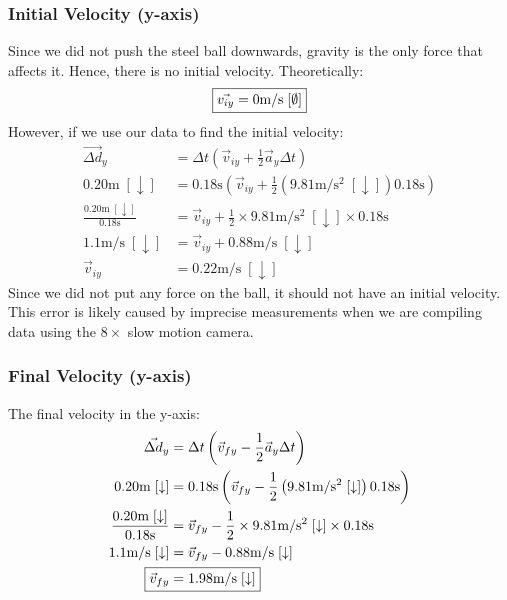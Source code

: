 \documentclass[a4paper,12pt]{article}
\begin{document}
	\subsubsection{Initial Velocity (y-axis)}
	Since we did not push the steel ball downwards, gravity is the only force that affects it. Hence, there is no initial velocity. Theoretically:
	\begin{align*}
		\Aboxed{\vec{v_{iy}}&=0\text{m}/\text{s}\;[\emptyset]}\\
	\end{align*}
	However, if we use our data to find the initial velocity:
	\begin{align*}
		\vec{\Delta d}_y&=\Delta t\left(\vec{v}_{iy}+\frac{1}{2}\vec{a}_y\Delta t\right)\\
		0.20\text{m}\;[\downarrow]&=0.18\text{s}\left(\vec{v}_{iy}+\frac{1}{2}\left(9.81\text{m}/\text{s}^2\;[\downarrow]\right)0.18\text{s}\right)\\
		\frac{0.20\text{m}\;[\downarrow]}{0.18\text{s}}&=\vec{v}_{iy}+\frac{1}{2}\times9.81\text{m}/\text{s}^2\;[\downarrow]\times0.18\text{s}\\
		1.1\text{m}/\text{s}\;[\downarrow]&=\vec{v}_{iy}+0.88\text{m}/\text{s}\;[\downarrow]\\
		\vec{v}_{iy}&=0.22\text{m}/\text{s}\;[\downarrow]
	\end{align*}
	Since we did not put any force on the ball, it should not have an initial velocity. This error is likely caused by imprecise measurements when we are compiling data using the $8\times$ slow motion camera. 
	
	\subsubsection{Final Velocity (y-axis)}
	The final velocity in the y-axis:
	\begin{align*}
		\vec{\Delta d}_y&=\Delta t\left(\vec{v}_{fy}-\frac{1}{2}\vec{a}_y\Delta t\right)\\
		0.20\text{m}\;[\downarrow]&=0.18\text{s}\left(\vec{v}_{fy}-\frac{1}{2}\left(9.81\text{m}/\text{s}^2\;[\downarrow]\right)0.18\text{s}\right)\\
		\frac{0.20\text{m}\;[\downarrow]}{0.18\text{s}}&=\vec{v}_{fy}-\frac{1}{2}\times9.81\text{m}/\text{s}^2\;[\downarrow]\times0.18\text{s}\\
		1.1\text{m}/\text{s}\;[\downarrow]&=\vec{v}_{fy}-0.88\text{m}/\text{s}\;[\downarrow]\\
		\Aboxed{\vec{v}_{fy}&=1.98\text{m}/\text{s}\;[\downarrow]}
	\end{align*}
	\newpage
\end{document}

